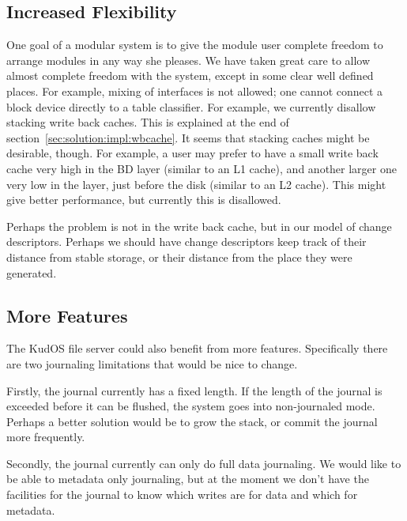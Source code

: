 \subsection{Increased Flexibility}
\label{sec:future:flexibility}


One goal of a modular system is to give the module user complete freedom to
arrange modules in any way she pleases. We have taken great care to allow
almost complete freedom with the system, except in some clear well defined
places. For example, mixing of interfaces is not allowed; one cannot
connect a block device directly to a table classifier. For example, we
currently disallow stacking write back caches. This is explained at the end
of section~\ref{sec:solution:impl:wbcache}. It seems that stacking caches
might be desirable, though. For example, a user may prefer to have a small
write back cache very high in the BD layer (similar to an L1 cache), and
another larger one very low in the layer, just before the disk (similar to
an L2 cache). This might give better performance, but currently this is
disallowed.

Perhaps the problem is not in the write back cache, but in our model of change
descriptors. Perhaps we should have change descriptors keep track of their
distance from stable storage, or their distance from the place they were
generated.

\subsection{More Features}
\label{sec:future:features}

The KudOS file server could also benefit from more features. Specifically there
are two journaling limitations that would be nice to change.

Firstly, the journal currently has a fixed length. If the length of the journal
is exceeded before it can be flushed, the system goes into non-journaled mode.
Perhaps a better solution would be to grow the stack, or commit the journal more
frequently.

Secondly, the journal currently can only do full data journaling. We would like
to be able to metadata only journaling, but at the moment we don't have the
facilities for the journal to know which writes are for data and which for
metadata.

